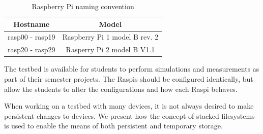 \begin{table}[ht!]
  \centering
  \begin{tabular}{|c|c|}
    \hline
      \textbf{Hostname} & \textbf{Model} \\ \hline
    rasp00 - rasp19 & Raspberry Pi 1 model B rev. 2 \\ \hline
    rasp20 - rasp29 & Rasperry Pi 2 model B V1.1 \\ \hline
  \end{tabular}
  \caption{Raspberry Pi naming convention}
  \label{tab:rasp_naming}
\end{table}









The testbed is available for students to perform simulations and
measurements as part of their semester projects. The \ac{Raspi}s should
be configured identically, but allow the students to alter the
configurations and how each \ac{Raspi} behaves.

When working on a testbed with many devices, it is not always desired
to make persistent
changes to devices. We present how the concept of stacked
filesystems is used to enable the means of both persistent and
temporary storage.

